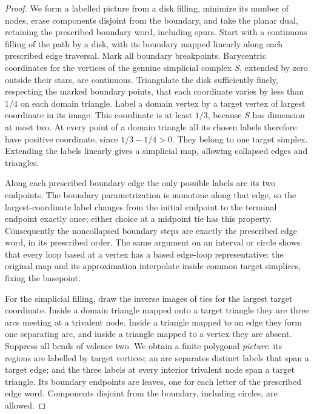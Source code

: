 \begin{proof}
We form a labelled picture from a disk filling, minimize its number of
nodes, erase components disjoint from the boundary, and take the planar
dual, retaining the prescribed boundary word, including spurs.
Start with a continuous filling of the path by a disk,
with its boundary mapped linearly along each prescribed edge traversal.
Mark all boundary breakpoints. Barycentric coordinates for the vertices
of the genuine simplicial complex $S$, extended by zero outside their
stars, are continuous. Triangulate the disk sufficiently finely,
respecting the marked boundary points, that each coordinate varies by
less than $1/4$ on each domain triangle. Label a domain vertex by a
target vertex of largest coordinate in its image. This coordinate is
at least $1/3$, because $S$ has dimension at most two. At every point of
a domain triangle all its chosen labels therefore have positive
coordinate, since $1/3-1/4>0$. They belong to one target simplex.
Extending the labels linearly gives a simplicial map, allowing collapsed
edges and triangles.

Along each prescribed boundary edge the only possible labels are its
two endpoints. The boundary parametrization is monotone along that edge,
so the largest-coordinate label changes from the initial endpoint to the
terminal endpoint exactly once; either choice at a midpoint tie has this
property. Consequently the noncollapsed boundary steps are exactly the
prescribed edge word, in its prescribed order. The same argument on an
interval or circle shows that every loop based at a vertex has a based
edge-loop representative: the original map and its approximation
interpolate inside common target simplices, fixing the basepoint.

For the simplicial filling, draw the inverse images of ties for the
largest target coordinate. Inside a domain triangle mapped onto a
target triangle they are three arcs meeting at a trivalent node.
Inside a triangle mapped to an edge they form one separating arc, and
inside a triangle mapped to a vertex they are absent. Suppress all bends
of valence two. We obtain a finite polygonal \emph{picture}: its regions
are labelled by target vertices; an arc separates distinct labels that
span a target edge; and the three labels at every interior trivalent
node span a target triangle. Its boundary endpoints are leaves, one for
each letter of the prescribed edge word. Components disjoint from the
boundary, including circles, are allowed.


\end{proof}
